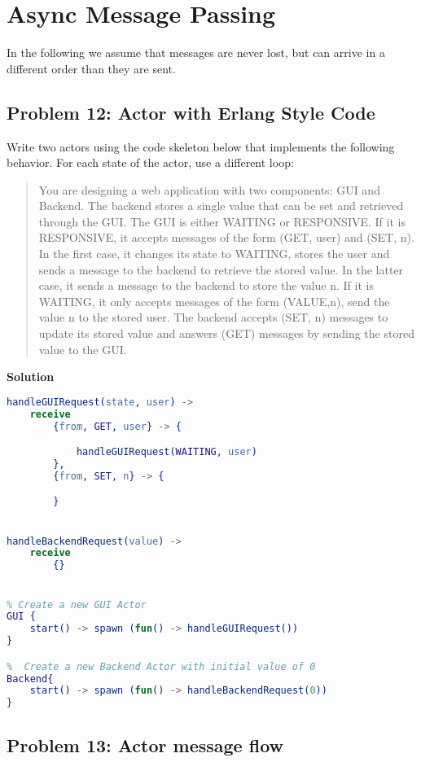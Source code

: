 \section{Async Message Passing}

In the following we assume that messages are never lost, but can arrive in a different order than
they are sent.

\subsection{Problem 12: Actor with Erlang Style Code}

Write two actors using the code skeleton below that implements the
following behavior. For each state of the actor, use a different loop: 

\begin{quote}
    You are designing a web application with two components: GUI and Backend. The
    backend stores a single value that can be set and retrieved through the GUI. The GUI
    is either WAITING or RESPONSIVE. If it is RESPONSIVE, it accepts messages
    of the form (GET, user) and (SET, n). In the first case, it changes its state to
    WAITING, stores the user and sends a message to the backend to retrieve the stored
    value. In the latter case, it sends a message to the backend to store the value n. If
    it is WAITING, it only accepts messages of the form (VALUE,n), send the value n
    to the stored user. The backend accepts (SET, n) messages to update its stored value and answers
    (GET) messages by sending the stored value to the GUI.
\end{quote}

\textbf{Solution}

\begin{lstlisting}[language=erlang]
handleGUIRequest(state, user) -> 
    receive
        {from, GET, user} -> {

            handleGUIRequest(WAITING, user)
        },
        {from, SET, n} -> {

        }


handleBackendRequest(value) -> 
    receive 
        {}


% Create a new GUI Actor
GUI {
    start() -> spawn (fun() -> handleGUIRequest())
}

%  Create a new Backend Actor with initial value of 0 
Backend{
    start() -> spawn (fun() -> handleBackendRequest(0))
}
\end{lstlisting}

\subsection{Problem 13: Actor message flow}

